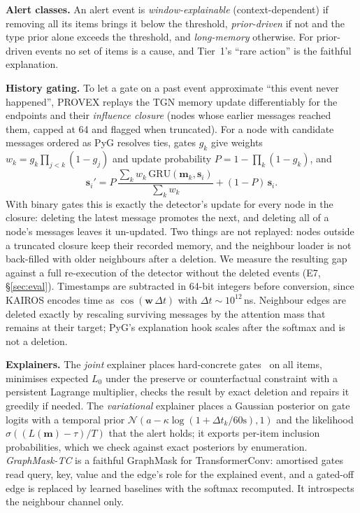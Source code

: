 \documentclass[conference]{IEEEtran}
\begin{document}
\textbf{Alert classes.} An alert event is \emph{window-explainable} (context-dependent) if removing all
its items brings it below the threshold, \emph{prior-driven} if not and the type prior alone exceeds the
threshold, and \emph{long-memory} otherwise. For prior-driven events no set of items is a cause, and
Tier~1's ``rare action'' is the faithful explanation.

\label{sec:history}
\textbf{History gating.} To let a gate on a past event approximate ``this event never happened'', PROVEX
replays the TGN memory update differentiably for the endpoints and their \emph{influence closure} (nodes
whose earlier messages reached them, capped at 64 and flagged when truncated). For a node with candidate
messages ordered as PyG resolves ties, gates $g_k$ give weights $w_k=g_k\prod_{j<k}(1-g_j)$ and update
probability $P=1-\prod_k(1-g_k)$, and
\[
\mathbf s_i'=P\,\frac{\sum_k w_k\,\mathrm{GRU}(\mathbf m_k,\mathbf s_i)}{\sum_k w_k}+(1-P)\,\mathbf s_i .
\]
With binary gates this is exactly the detector's update for every node in the closure: deleting the latest
message promotes the next, and deleting all of a node's messages leaves it un-updated. Two things are not
replayed: nodes outside a truncated closure keep their recorded memory, and the neighbour loader is not
back-filled with older neighbours after a deletion. We measure the resulting gap against a full
re-execution of the detector without the deleted events (E7, \S\ref{sec:eval}). Timestamps are subtracted in 64-bit integers
before conversion, since KAIROS encodes time as $\cos(\mathbf w\,\Delta t)$ with $\Delta t\sim10^{12}$\,ns.
Neighbour edges are deleted exactly by rescaling surviving messages by the attention mass that remains
at their target; PyG's explanation hook scales after the softmax and is not a deletion.

\label{sec:variational}
\textbf{Explainers.} The \emph{joint} explainer places hard-concrete gates~\cite{louizos} on all items,
minimises expected $L_0$ under the preserve or counterfactual constraint with a persistent Lagrange
multiplier, checks the result by exact deletion and repairs it greedily if needed. The \emph{variational}
explainer places a Gaussian posterior on gate logits with a temporal prior
$\mathcal N(a-\kappa\log(1+\Delta t_k/60\text{s}),1)$ and the likelihood $\sigma((L(\mathbf m)-\tau)/T)$
that the alert holds; it exports per-item inclusion probabilities, which we check against exact
posteriors by enumeration. \label{sec:graphmask}\emph{GraphMask-TC} is a faithful GraphMask for
TransformerConv: amortised gates read query, key, value and the edge's role for the explained event, and
a gated-off edge is replaced by learned baselines with the softmax recomputed. It introspects the
neighbour channel only.
\end{document}
